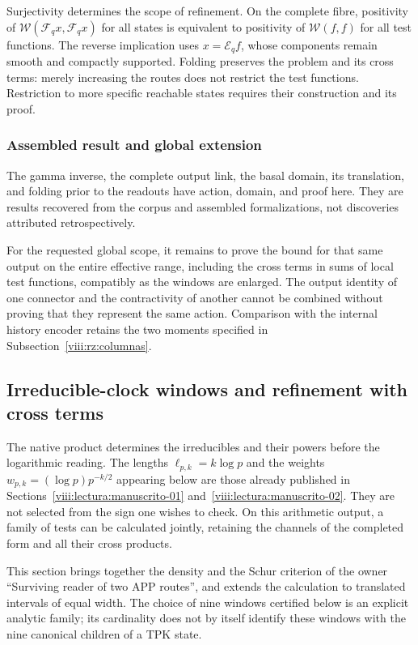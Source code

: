 Surjectivity determines the scope of refinement. On the complete fibre, positivity of \(\mathscr W(\mathcal F_qx,\mathcal F_qx)\) for all states is equivalent to positivity of \(\mathscr W(f,f)\) for all test functions. The reverse implication uses \(x=\mathcal E_qf\), whose components remain smooth and compactly supported. Folding preserves the problem and its cross terms: merely increasing the routes does not restrict the test functions. Restriction to more specific reachable states requires their construction and its proof.

\subsubsection*{Assembled result and global extension}
The gamma inverse, the complete output link, the basal domain, its translation, and folding prior to the readouts have action, domain, and proof here. They are results recovered from the corpus and assembled formalizations, not discoveries attributed retrospectively.

For the requested global scope, it remains to prove the bound for that same output on the entire effective range, including the cross terms in sums of local test functions, compatibly as the windows are enlarged. The output identity of one connector and the contractivity of another cannot be combined without proving that they represent the same action. Comparison with the internal history encoder retains the two moments specified in Subsection~\ref{viii:rz:columnas}.

\subsection{Irreducible-clock windows and refinement with cross terms}
\label{viii:rz:ventanas}
The native product determines the irreducibles and their powers before the logarithmic reading. The lengths \(\ell_{p,k}=k\log p\) and the weights \(w_{p,k}=(\log p)p^{-k/2}\) appearing below are those already published in Sections~\ref{viii:lectura:manuscrito-01} and~\ref{viii:lectura:manuscrito-02}. They are not selected from the sign one wishes to check. On this arithmetic output, a family of tests can be calculated jointly, retaining the channels of the completed form and all their cross products.

This section brings together the density and the Schur criterion of the owner “Surviving reader of two APP routes”, and extends the calculation to translated intervals of equal width. The choice of nine windows certified below is an explicit analytic family; its cardinality does not by itself identify these windows with the nine canonical children of a TPK state.

